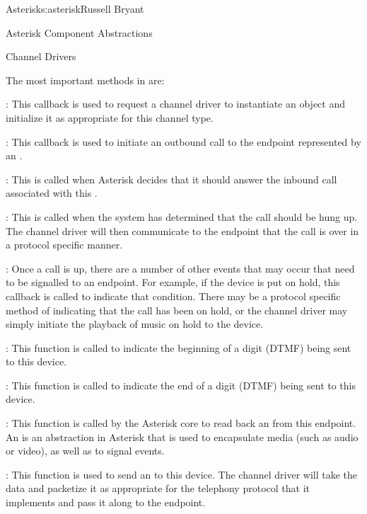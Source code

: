 \begin{aosachapter}{Asterisk}{s:asterisk}{Russell Bryant}
\begin{aosasect1}{Asterisk Component Abstractions}
\begin{aosasect2}{Channel Drivers}

The most important methods in  are:

\begin{aosaitemize}

\item {}: This callback is used to
request a channel driver to instantiate an
 object and initialize it as
appropriate for this channel type.

\item {}: This callback is used to initiate an
outbound call to the endpoint represented by an
.

\item {}: This is called when Asterisk
decides that it should answer the inbound call associated with this
.

\item {}: This is called when the system has
determined that the call should be hung up. The channel driver will
then communicate to the endpoint that the call is over in a protocol
specific manner.

\item {}: Once a call is up, there are a
number of other events that may occur that need to be signalled to an
endpoint. For example, if the device is put on hold, this callback
is called to indicate that condition. There may be a protocol
specific method of indicating that the call has been on hold, or the
channel driver may simply initiate the playback of music on hold to
the device.

\item {}: This function is called
to indicate the beginning of a digit (DTMF) being sent to this
device.

\item {}: This function is called to
indicate the end of a digit (DTMF) being sent to this device.

\item {}: This function is called by the
Asterisk core to read back an  from this
endpoint. An  is an abstraction in
Asterisk that is used to encapsulate media (such as audio or video),
as well as to signal events.

\item {}: This function is used to send an
 to this device. The channel driver will
take the data and packetize it as appropriate for the telephony
protocol that it implements and pass it along to the
endpoint.


\end{aosaitemize}
\end{aosasect2}
\end{aosasect1}
\end{aosachapter}

